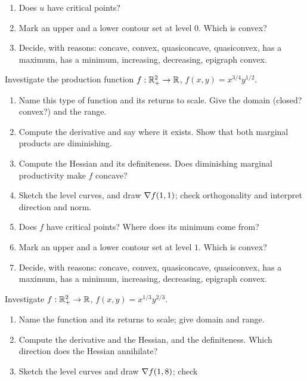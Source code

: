 \begin{problems}
\begin{enumerate}[label=(\alph*),leftmargin=1.8em,itemsep=0.2ex]
          \item Does $u$ have critical points?
          \item Mark an upper and a lower contour set at level $0$. Which is
                convex?
          \item Decide, with reasons: concave, convex, quasiconcave,
                quasiconvex, has a maximum, has a minimum, increasing,
                decreasing, epigraph convex.
        \end{enumerate}
  \item Investigate the production function $f:\mathbb{R}^{2}_{+}\to\mathbb{R}$,
        $f(x,y)=x^{3/4}y^{1/2}$.
        \begin{enumerate}[label=(\alph*),leftmargin=1.8em,itemsep=0.2ex]
          \item Name this type of function and its returns to scale. Give
                the domain (closed? convex?) and the range.
          \item Compute the derivative and say where it exists. Show that
                both marginal products are diminishing.
          \item Compute the Hessian and its definiteness. Does diminishing
                marginal productivity make $f$ concave?
          \item Sketch the level curves, and draw $\nabla f(1,1)$; check
                orthogonality and interpret direction and norm.
          \item Does $f$ have critical points? Where does its minimum come
                from?
          \item Mark an upper and a lower contour set at level $1$. Which is
                convex?
          \item Decide, with reasons: concave, convex, quasiconcave,
                quasiconvex, has a maximum, has a minimum, increasing,
                decreasing, epigraph convex.
        \end{enumerate}
  \item Investigate $f:\mathbb{R}^{2}_{+}\to\mathbb{R}$, $f(x,y)=x^{1/3}y^{2/3}$.
        \begin{enumerate}[label=(\alph*),leftmargin=1.8em,itemsep=0.2ex]
          \item Name the function and its returns to scale; give domain and
                range.
          \item Compute the derivative and the Hessian, and the
                definiteness. Which direction does the Hessian annihilate?
          \item Sketch the level curves and draw $\nabla f(1,8)$; check

\end{enumerate}
\end{problems}

